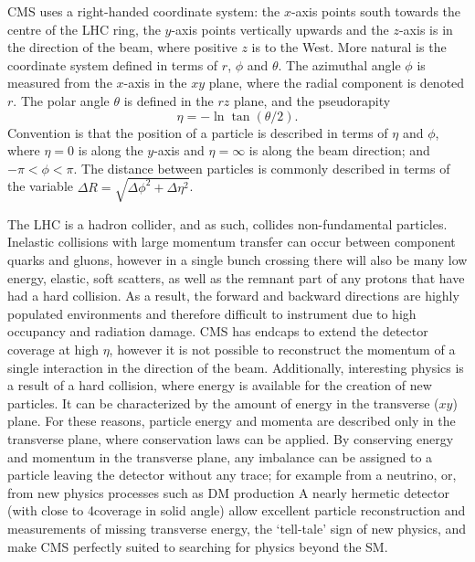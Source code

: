 \ac{CMS} uses a right-handed coordinate system: the $x$-axis points south towards the centre of the \ac{LHC} ring, the $y$-axis points vertically upwards and the $z$-axis is in the direction of the beam, where positive $z$ is to the West.
More natural is the coordinate system defined in terms of $r$, $\phi$ and $\theta$.
The azimuthal angle $\phi$ is measured from the $x$-axis in the $xy$ plane, where the radial component is denoted $r$. The polar angle $\theta$ is defined in the $rz$ plane, and the pseudorapity 
\begin{equation}
\eta = - \ln \tan (\theta /2).
\end{equation}
Convention is that the position of a particle is described in terms of $\eta$ and $\phi$, where $\eta = 0$ is along the $y$-axis and $\eta = \infty $ is along the beam direction; and $-\pi < \phi < \pi$. The distance between particles is commonly described in terms of the variable $\Delta R = \sqrt{\Delta\phi^2+\Delta\eta^2}$.

The \ac{LHC} is a hadron collider, and as such, collides non-fundamental particles. 
Inelastic collisions with large momentum transfer can occur between component quarks and gluons, however in a single bunch crossing there will also be many low energy, elastic, soft scatters, 
as well as the remnant part of any protons that have had a hard collision. 
As a result, the forward and backward directions are highly populated environments and therefore difficult to instrument due to high occupancy and radiation damage. 
\ac{CMS} has endcaps to extend the detector coverage at high $\eta$, however it is not possible to reconstruct the momentum of a single interaction in the direction of the beam.   
Additionally, interesting physics is a result of a hard collision, where energy is available for the creation of new particles. It can be characterized by the amount of energy in the transverse ($xy$) plane.
For these reasons, particle energy and momenta are described only in the transverse plane, where conservation laws can be applied.
By conserving energy and momentum in the transverse plane, any imbalance can be assigned to a particle leaving the detector without any trace; for example from a neutrino, or, from new physics processes such as \ac{DM} production
A nearly hermetic detector (with close to 4\pi coverage in solid angle) allow excellent particle reconstruction and measurements of missing transverse energy, the `tell-tale' sign of new physics, and make \ac{CMS} perfectly suited to searching for physics beyond the \ac{SM}.

